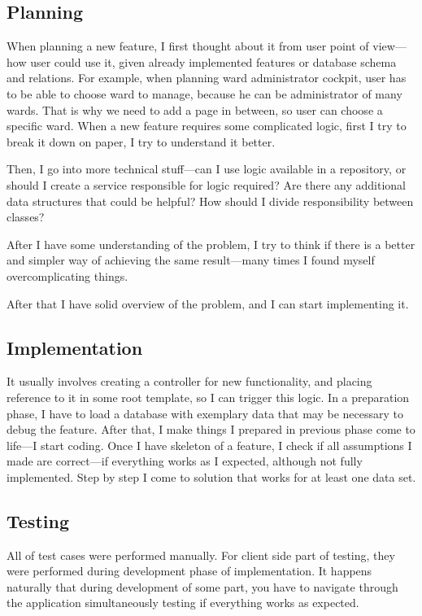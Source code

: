 \documentclass[a4paper,twoside,12pt]{book}
\begin{document}
      \subsection{Planning}
        When planning a new feature, I first thought about it from user point of view---how user could use it, given already implemented features or database schema and relations.
        For example, when planning ward administrator cockpit, user has to be able to choose ward to manage, because he can be administrator of many wards.
        That is why we need to add a page in between, so user can choose a specific ward.
        When a new feature requires some complicated logic, first I try to break it down on paper, I try to understand it better.

        Then, I go into more technical stuff---can I use logic available in a repository, or should I create a service responsible for logic required?
        Are there any additional data structures that could be helpful?
        How should I divide responsibility between classes?

        After I have some understanding of the problem, I try to think if there is a better and simpler way of achieving the same result---many times I found myself overcomplicating things.

        After that I have solid overview of the problem, and I can start implementing it.

      \subsection{Implementation}
        It usually involves creating a controller for new functionality, and placing reference to it in some root template, so I can trigger this logic.
        In a preparation phase, I have to load a database with exemplary data that may be necessary to debug the feature.
        After that, I make things I prepared in previous phase come to life---I start coding.
        Once I have skeleton of a feature, I check if all assumptions I made are correct---if everything works as I expected, although not fully implemented.
        Step by step I come to solution that works for at least one data set.
        
      \subsection{Testing}
        All of test cases were performed manually.
        For client side part of testing, they were performed during development phase of implementation.
        It happens naturally that during development of some part, you have to navigate through the application simultaneously testing if everything works as expected.
\end{document}
